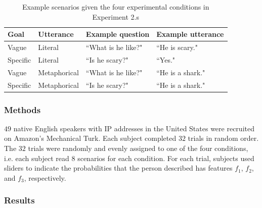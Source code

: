 \documentclass[10pt,letterpaper]{article}
\begin{document}
\begin{table}[h]
\tabcolsep=0.2cm
\small
\begin{tabular}{llll}
\toprule
Goal & Utterance & Example question & Example utterance \\
\midrule
Vague & Literal & ``What is he like?" & ``He is scary." \\
Specific  & Literal & ``Is he scary?" & ``Yes." \\
Vague & Metaphorical & ``What is he like?" & ``He is a shark." \\
Specific & Metaphorical & ``Is he scary?" & ``He is a shark." \\
\bottomrule
\end{tabular}
\caption{Example scenarios given the four experimental conditions in Experiment 2.s}
\end{table}

\subsubsection{Methods}
$49$ native English speakers with IP addresses in the United States were recruited on Amazon's Mechanical Turk. Each subject completed $32$ trials in random order. The $32$ trials were randomly and evenly assigned to one of the four conditions, i.e. each subject read $8$ scenarios for each condition. For each trial, subjects used sliders to indicate the probabilities that the person described has features $f_1$, $f_2$, and $f_3$, respectively.



\subsubsection{Results}
\end{document}
